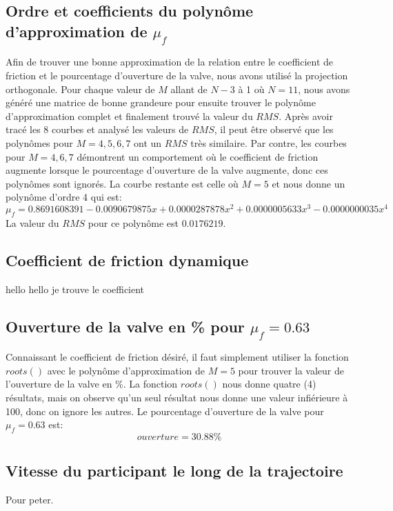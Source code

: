 \documentclass{article}
\begin{document}
\subsection{Ordre et coefficients du polynôme d'approximation de $\mu_f$}
Afin de trouver une bonne approximation de la relation entre le coefficient de friction et le pourcentage d'ouverture de la valve, nous avons utilisé la projection orthogonale. Pour chaque valeur de $M$ allant de $N-3$ à 1 où $N=11$, nous avons généré une matrice de bonne grandeure pour ensuite trouver le polynôme d'approximation complet et finalement trouvé la valeur du $RMS$. Après avoir tracé les 8 courbes et analysé les valeurs de $RMS$, il peut être observé que les polynômes pour $M=4,5,6,7$ ont un $RMS$ très similaire. Par contre, les courbes pour $M=4,6,7$ démontrent un comportement où le coefficient de friction augmente lorsque le pourcentage d'ouverture de la valve augmente, donc ces polynômes sont ignorés. La courbe restante est celle où $M=5$ et nous donne un polynôme d'ordre 4 qui est:
\begin{equation}
	\mu_f = 0.8691608391-0.0090679875x+0.0000287878x^2+0.0000005633x^3-0.0000000035x^4 
\end{equation}
La valeur du $RMS$ pour ce polynôme est $0.0176219$.

\subsection{Coefficient de friction dynamique}
hello hello je trouve le coefficient

\subsection{Ouverture de la valve en \% pour $\mu_f=0.63$}
Connaissant le coefficient de friction désiré, il faut simplement utiliser la fonction $roots()$ avec le polynôme d'approximation de $M=5$ pour trouver la valeur de l'ouverture de la valve en \%. La fonction $roots()$ nous donne quatre (4) résultats, mais on observe qu'un seul résultat nous donne une valeur infiérieure à 100, donc on ignore les autres. Le pourcentage d'ouverture de la valve pour $\mu_f=0.63$ est:
\begin{equation}
	ouverture = 30.88\%
\end{equation}

\subsection{Vitesse du participant le long de la trajectoire}
Pour peter.
\end{document}
